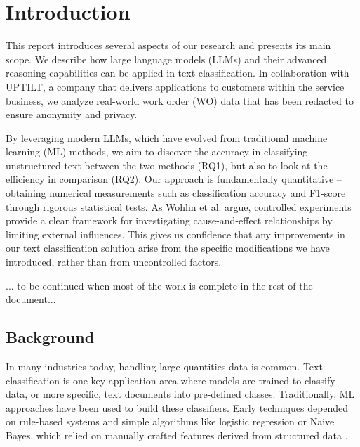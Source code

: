 \section{Introduction}

This report introduces several aspects of our research and presents its main scope. We describe how large language models (LLMs) and their advanced reasoning capabilities can be applied in text classification. In collaboration with UPTILT, a company that delivers applications to customers within the service business, we analyze real-world work order (WO) data that has been redacted to ensure anonymity and privacy.

By leveraging modern LLMs, which have evolved from traditional machine learning (ML) methods, we aim to discover the accuracy in classifying unstructured text between the two methods (RQ1), but also to look at the efficiency in comparison (RQ2). Our approach is fundamentally quantitative -- obtaining numerical measurements such as classification accuracy and F1-score through rigorous statistical tests. As Wohlin et al. \cite{wohlin2000software} argue, controlled experiments provide a clear framework for investigating cause-and-effect relationships by limiting external influences. This gives us confidence that any improvements in our text classification solution arise from the specific modifications we have introduced, rather than from uncontrolled factors.

... to be continued when most of the work is complete in the rest of the document...

\subsection{Background}

In many industries today, handling large quantities data is common. Text classification is one key application area where models are trained to classify data, or more specific, text documents into pre-defined classes. Traditionally, ML approaches have been used to build these classifiers. Early techniques depended on rule-based systems and simple algorithms like logistic regression or Naive Bayes, which relied on manually crafted features derived from structured data \cite{bing2011mining}. 

